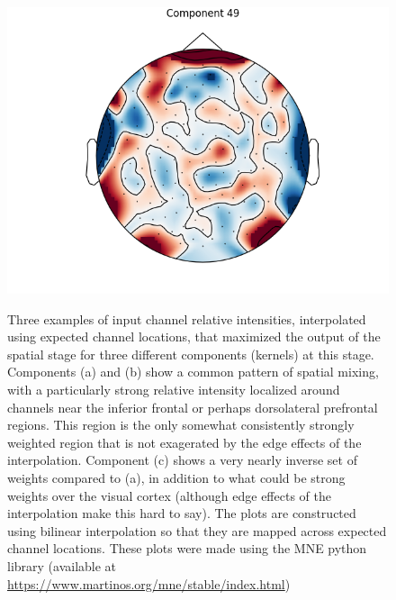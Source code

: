 \documentclass[fleqn,10pt]{wlscirep}
\begin{document}
\begin{figure}[h!]
\begin{minipage}{0.31\textwidth}
    \includegraphics[width=\linewidth]{max_act/49.png}
    \subcaption{}
    \label{fig:component_49}
  \end{minipage}
  \caption[textfind]{Three examples of input channel relative intensities, interpolated using expected channel locations, that maximized the output of the spatial stage for three different components (kernels) at this stage. Components (a) and (b) show a common pattern of spatial mixing, with a particularly strong relative intensity localized around channels near the inferior frontal or perhaps dorsolateral prefrontal regions. This region is the only somewhat consistently strongly weighted region that is not exagerated by the edge effects of the interpolation. Component (c) shows a very nearly inverse set of weights compared to (a), in addition to what could be strong weights over the visual cortex (although edge effects of the interpolation make this hard to say). The plots are constructed using bilinear interpolation so that they are mapped across expected channel locations. These plots were made using the MNE python library (available at \url{https://www.martinos.org/mne/stable/index.html})} \label{fig:max_components}
\end{figure}

\end{document}
